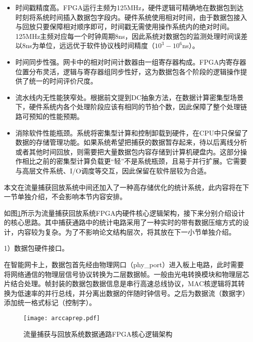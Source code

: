 \begin{itemize}
	\item 时间戳精度高。FPGA运行主频为125MHz，硬件逻辑可精确地在数据包到达时刻将系统时间插入数据包字段内。硬件系统使用相对时间，由于数据包接入与回放只要保障相对顺序即可，时间戳无需使用操作系统内的绝对时间。125MHz主频对应每一个时钟周期8ns，因此系统对数据包的监测处理时间误差以8ns为单位，远远优于软件协议栈时间精度（$10^3-10^6$ns）。
	\item 时间同步性强。网卡中的相对时间计数器由一组寄存器构成。FPGA内寄存器位置分布灵活，逻辑与寄存器组同步性好，这为数据包各个阶段的逻辑操作提供了统一的时间评价尺度。
	\item 流水线内无性能狭窄处。根据前文提到DC抽象方法，在数据计算密集型场景下，硬件系统内各个处理阶段应该有相同的节拍个数，因此保障了整个处理链路可预知的性能预期。
	\item 消除软件性能瓶颈。系统将密集型计算和控制卸载到硬件，在CPU中只保留了数据的存储管理功能。如果系统希望把捕获的数据暂存起来，待以后离线分析或者其他时间回放，则需要把大量数据包内容存储到计算机硬盘内。这部分操作相比之前的密集型计算负载更“轻”不是系统瓶颈，且易于并行扩展。它需要与高层文件系统、I/O调度等交互，因此保留在软件层较为合适。
\end{itemize}

本文在流量捕获回放系统中间还加入了一种高存储优化的统计系统，此内容将在下一节单独介绍，不会影响本节内容安排。

\label{chap344}

如图\ref{fig:arccaprep}所示为流量捕获回放系统FPGA内硬件核心逻辑架构，接下来分别介绍设计的核心思路。其中捕获通路中的统计电路采用了一种实时的带有数据压缩方式的设计，内容较为复杂。为了不影响论文结构层次，将其放在下一小节单独介绍。

1）数据包硬件接口。

在智能网卡上，数据包首先经由物理网口（phy\_port）进入板上电路，此时需要将网络通信的物理层信号协议转换为二层数据帧。一般由光电转换模块和物理层芯片结合处理。帧封装的数据包数据信息是串行高速总线协议，MAC核逻辑将其转换为低速率的并行总线，并分离出数据的伴随时钟信号。之后为数据流（数据字）添加统一格式标记（控制字）。

\begin{figure}[!ht]
	\centering 
	\vspace{-1.5mm}
	\texttt{[image: arccaprep.pdf]}
	\caption{流量捕获与回放系统数据通路FPGA核心逻辑架构} \label{fig:arccaprep}
\end{figure}

